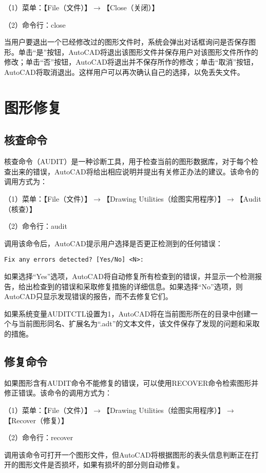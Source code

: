 （1）菜单：【File（文件）】$\to$【Close（关闭）】

（2）命令行：close

当用户要退出一个已经修改过的图形文件时，系统会弹出对话框询问是否保存图形。单击“是”按钮，AutoCAD将退出该图形文件并保存用户对该图形文件所作的修改；单击“否”按钮，AutoCAD将退出并不保存所作的修改；单击“取消”按钮，AutoCAD将取消退出。这样用户可以再次确认自己的选择，以免丢失文件。

\chapter{图形修复}

\section{核查命令}


核查命令（AUDIT）是一种诊断工具，用于检查当前的图形数据库，对于每个检查出来的错误，AutoCAD将给出相应说明并提出有关修正办法的建议。该命令的调用方式为：

（1）菜单：【File（文件）】$\to$【Drawing Utilities（绘图实用程序）】$\to$【Audit（核查）】

（2）命令行：audit

调用该命令后，AutoCAD提示用户选择是否更正检测到的任何错误：

\begin{verbatim}
Fix any errors detected? [Yes/No] <N>: 
\end{verbatim}

如果选择“Yes”选项，AutoCAD将自动修复所有检查到的错误，并显示一个检测报告，给出检查到的错误和采取修复措施的详细信息。如果选择“No”选项，则AutoCAD只显示发现错误的报告，而不去修复它们。

如果系统变量AUDITCTL设置为1，AutoCAD将在当前图形所在的目录中创建一个与当前图形同名、扩展名为“.adt”的文本文件，该文件保存了发现的问题和采取的措施。


\section{修复命令}

如果图形含有AUDIT命令不能修复的错误，可以使用RECOVER命令检索图形并修正错误。该命令的调用方式为：

（1）菜单：【File（文件）】$\to$【Drawing Utilities（绘图实用程序）】$\to$【Recover（修复）】

（2）命令行：recover

调用该命令可打开一个图形文件，但AutoCAD将根据图形的表头信息判断正在打开的图形文件是否损坏，如果有损坏的部分则自动修复。

